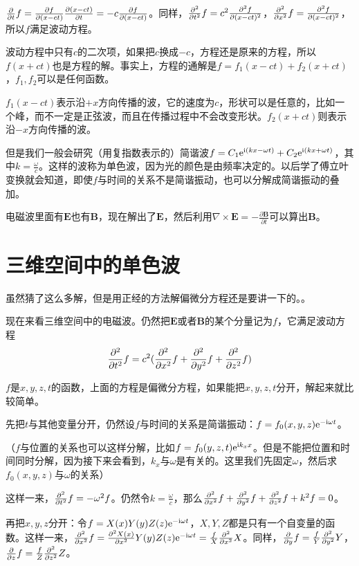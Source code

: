 $\frac{\partial}{\partial t} f=\frac{\partial f}{\partial(x-c t)}\frac{\partial(x-c t)}{\partial t}=-c \frac{\partial f}{\partial(x-c t)}$。同样，$\frac{\partial^{2}}{\partial t^{2}} f=c^2 \frac{\partial^2 f}{\partial(x-c t)^2}$，$\frac{\partial^{2}}{\partial x^{2}} f=\frac{\partial^2 f}{\partial(x-c t)^2}$，所以$f$满足波动方程。

波动方程中只有$c$的二次项，如果把$c$换成$-c$，方程还是原来的方程，所以$f(x+c t)$也是方程的解。事实上，方程的通解是$f=f_1(x-c t)+f_2(x+c t)$，$f_1,f_2$可以是任何函数。

$f_1(x-c t)$表示沿$+x$方向传播的波，它的速度为$c$，形状可以是任意的，比如一个峰，而不一定是正弦波，而且在传播过程中不会改变形状。$f_2(x+c t)$则表示沿$-x$方向传播的波。

但是我们一般会研究（用复指数表示的）简谐波$f=C_1 \mathrm{e}^{\mathrm{i} (k x-\omega t)}+C_2 \mathrm{e}^{\mathrm{i} (k x+\omega t)}$，其中$k=\frac{\omega}{c}$。这样的波称为单色波，因为光的颜色是由频率决定的。以后学了傅立叶变换就会知道，即使$f$与时间的关系不是简谐振动，也可以分解成简谐振动的叠加。

电磁波里面有$\mathbf{E}$也有$\mathbf{B}$，现在解出了$\mathbf{E}$，然后利用$\nabla \times \mathbf{E}=-\frac{\partial \mathbf{B}}{\partial t}$可以算出$\mathbf{B}$。
\section{三维空间中的单色波}
虽然猜了这么多解，但是用正经的方法解偏微分方程还是要讲一下的。。

现在来看三维空间中的电磁波。仍然把$\mathbf{E}$或者$\mathbf{B}$的某个分量记为$f$，它满足波动方程
\begin{equation*}
\frac{\partial^{2}}{\partial t^{2}} f=c^2 (\frac{\partial^{2}}{\partial x^{2}} f+\frac{\partial^{2}}{\partial y^{2}} f+\frac{\partial^{2}}{\partial z^{2}} f)
\end{equation*}

$f$是$x,y,z,t$的函数，上面的方程是偏微分方程，如果能把$x,y,z,t$分开，解起来就比较简单。

先把$t$与其他变量分开，仍然设$f$与时间的关系是简谐振动：$f=f_0(x,y,z) \mathrm{e}^{-\mathrm{i} \omega t}$。

（$f$与位置的关系也可以这样分解，比如$f=f_0(y,z,t) \mathrm{e}^{\mathrm{i} k_x x}$。但是不能把位置和时间同时分解，因为接下来会看到，$k_x$与$\omega$是有关的。这里我们先固定$\omega$，然后求$f_0(x,y,z)$与$\omega$的关系）

这样一来，$\frac{\partial^{2}}{\partial t^{2}} f=-\omega^2 f$。仍然令$k=\frac{\omega}{c}$，那么$\frac{\partial^{2}}{\partial x^{2}} f+\frac{\partial^{2}}{\partial y^{2}} f+\frac{\partial^{2}}{\partial z^{2}} f+k^2 f=0$。

再把$x,y,z$分开：令$f=X(x) Y(y) Z(z) \mathrm{e}^{-\mathrm{i} \omega t}$，$X,Y,Z$都是只有一个自变量的函数。这样一来，$\frac{\partial^{2}}{\partial x^{2}} f=\frac{\partial^2 X(x)}{\partial x^2}  Y(y) Z(z) \mathrm{e}^{-\mathrm{i} \omega t}=\frac{f}{X} \frac{\partial^{2}}{\partial x^{2}} X$。同样，$\frac{\partial}{\partial y} f=\frac{f}{Y} \frac{\partial^{2}}{\partial y^{2}} Y$，$\frac{\partial}{\partial z} f=\frac{f}{Z} \frac{\partial^{2}}{\partial z^{2}} Z$。

